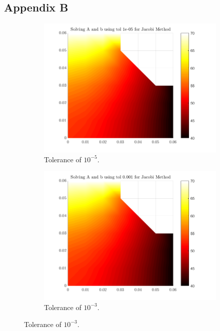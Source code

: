 \documentclass[12pt,a4paper]{article}
\begin{document}
\subsection*{Appendix B}
\begin{figure}[H]
	\centering
	\begin{subfigure}[b]{0.48\textwidth}
		\centering
		\includegraphics[width=\linewidth]{images/JacobiComparisontole-05.png}
		\caption{Tolerance of $10^{-5}$.}
		\label{fig:Jacobitole-05}
	\end{subfigure}
	\hfill
	\begin{subfigure}[b]{0.48\textwidth}
		\centering
		\includegraphics[width=\linewidth]{images/JacobiComparisontol0-001.png}
		\caption{Tolerance of $10^{-3}$.}

\end{subfigure}
\end{figure}
\end{document}
